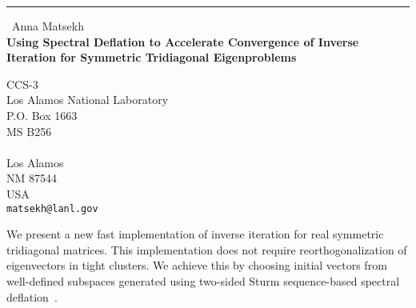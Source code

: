 \documentclass{report}
\begin{document}
\begin{center}
\rule{6in}{1pt} \
{\large Anna Matsekh \\
{\bf Using Spectral Deflation to Accelerate Convergence of Inverse Iteration for Symmetric Tridiagonal Eigenproblems}}

CCS-3 \\ Los Alamos National Laboratory  \\ P.O. Box 1663 \\ MS B256 \\  \\ Los Alamos \\ NM 87544 \\ USA
\\
{\tt matsekh@lanl.gov}\end{center}

We present a new fast implementation of inverse iteration for
real symmetric tridiagonal matrices. This implementation does not
require reorthogonalization of eigenvectors in tight clusters.
We achieve this by choosing initial vectors from well-defined
subspaces generated using two-sided Sturm sequence-based spectral
deflation~\cite{garant:eng}.
\end{document}
